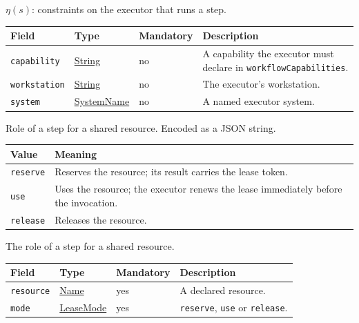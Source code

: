 \documentclass[a4paper]{arrowhead}
\newcommand{\mref}[1]{{\textcolor{ArrowheadPurple}{\hyperref[sec:model:#1]{#1}}}}
\newcommand{\pref}[1]{{\textcolor{ArrowheadGrey}{\hyperref[sec:model:primitives:#1]{#1}}}}
\begin{document}
$\eta(s)$: constraints on the executor that runs a step.

{\small
\begin{longtable}{|p{3.7cm}|p{4.2cm}|p{1.6cm}|p{6.3cm}|}

\hline
\rowcolor{gray!33} Field & Type & Mandatory & Description \\ \hline
\endhead
\texttt{capability} & \pref{String} & no & A capability the executor must declare in \texttt{workflow\allowbreak{}Capabilities}. \\ \hline
\texttt{workstation} & \pref{String} & no & The executor's workstation. \\ \hline
\texttt{system} & \pref{SystemName} & no & A named executor system. \\ \hline
\end{longtable}
}

Role of a step for a shared resource.
 Encoded as a JSON string.
{\small
\begin{longtable}{|p{3.9cm}|p{11.9cm}|}

\hline
\rowcolor{gray!33} Value & Meaning \\ \hline
\endhead
\texttt{reserve} & Reserves the resource; its result carries the lease token. \\ \hline
\texttt{use} & Uses the resource; the executor renews the lease immediately before the invocation. \\ \hline
\texttt{release} & Releases the resource. \\ \hline
\end{longtable}
}

The role of a step for a shared resource.

{\small
\begin{longtable}{|p{3.7cm}|p{4.2cm}|p{1.6cm}|p{6.3cm}|}

\hline
\rowcolor{gray!33} Field & Type & Mandatory & Description \\ \hline
\endhead
\texttt{resource} & \pref{Name} & yes & A declared resource. \\ \hline
\texttt{mode} & \mref{LeaseMode} & yes & \texttt{reserve}, \texttt{use} or \texttt{release}. \\ \hline
\end{longtable}
}
\end{document}
